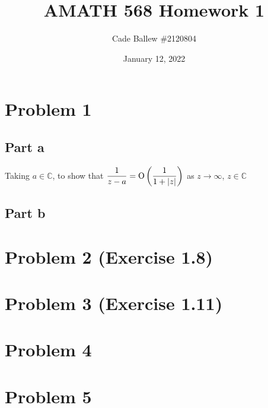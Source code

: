 \documentclass{article}
\title{AMATH 568 Homework 1}
\author{Cade Ballew \#2120804}
\date{January 12, 2022}
\begin{document}
\maketitle

\section{Problem 1}
\subsection{Part a}
Taking $a\in\mathbb{C}$, to show that $\displaystyle \frac{1}{z -a} = \operatorname{O}\left(\frac{1}{1 + |z|} \right)$ as $z \to \infty$, $z \in \mathbb C$

\subsection{Part b}

\section{Problem 2 (Exercise 1.8)}

\section{Problem 3 (Exercise 1.11)}

\section{Problem 4}

\section{Problem 5}
\end{document}
